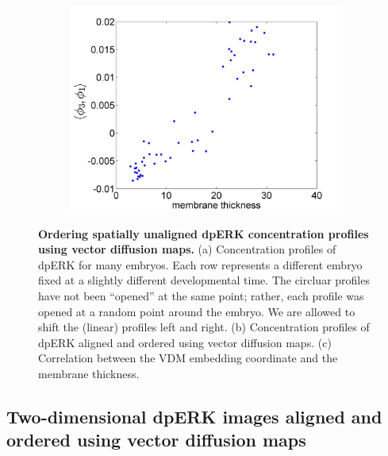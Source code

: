 \documentclass[10pt]{article}
\begin{document}
\begin{figure}[H]
\begin{subfigure}{0.3\textwidth}
\includegraphics[width=\textwidth]{VDM_time_corr}
\caption{}
\end{subfigure}
\caption{{\bf Ordering spatially unaligned dpERK concentration profiles using vector diffusion maps.} (a) Concentration profiles of dpERK for many embryos. Each row represents a different embryo fixed at a slightly different developmental time. The circluar profiles have not been ``opened'' at the same point; rather, each profile was opened at a random point around the embryo. We are allowed to shift the (linear) profiles left and right.
(b) Concentration profiles of dpERK aligned and ordered using vector diffusion maps.
(c) Correlation between the VDM embedding coordinate and the membrane thickness.}
\label{fig:vdm_ordering}
\end{figure}

\subsection*{Two-dimensional dpERK images aligned and ordered using vector diffusion maps}
\end{document}
